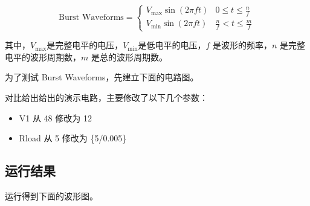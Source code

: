 \documentclass[lang=cn,10pt]{elegantbook}
\begin{document}
$$
\text{Burst Waveforms} = \begin{cases}
V_{\text{max}} \sin(2\pi f t) & 0 \leq t \leq \frac{n}{f}\\
V_{\text{min}} \sin(2\pi f t) & \frac{n}{f} < t \leq \frac{m}{f}
\end{cases}
$$

其中，$V_{\text{max}}$是完整电平的电压，$V_{\text{min}}$是低电平的电压，$f$ 是波形的频率，$n$ 是完整电平的波形周期数，$m$ 是总的波形周期数。

为了测试 Burst Waveforms，先建立下面的电路图。

对比给出给出的演示电路，主要修改了以下几个参数：

\begin{itemize}
    \item V1 从 48 修改为 12
    \item Rload 从 5 修改为 \{5/0.005\}
\end{itemize}

\subsection{运行结果}

运行得到下面的波形图。
\end{document}

